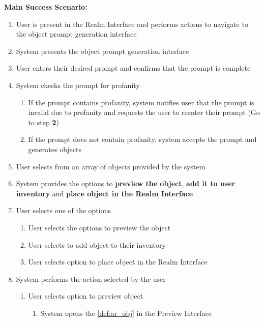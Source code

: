 \documentclass{article}
\begin{document}
\begin{enumerate}[label=\textbf{UC\arabic*}]
          \textbf{Main Success Scenario:}
          \begin{enumerate}[label=\textbf{\arabic*.}]
              \item User is present in the Realm Interface and performs actions to navigate to the object prompt generation interface
              \item System presents the object prompt generation interface
              \item User enters their desired prompt and confirms that the prompt is complete
              \item System checks the prompt for profanity
                    \begin{enumerate}[label=(\alph*)]
                        \item If the prompt contains profanity, system notifies user that the prompt is invalid due to profanity and requests the user to reenter their prompt (Go to step \textbf{2})
                        \item If the prompt does not contain profanity, system accepts the prompt and generates objects
                    \end{enumerate}
              \item User selects from an array of objects provided by the system
              \item System provides the options to \textbf{preview the object}, \textbf{add it to user inventory} and \textbf{place object in the Realm Interface}
              \item User selects one of the options
                    \begin{enumerate}[label=(\alph*)]
                        \item User selects the options to preview the object
                        \item User selects to add object to their inventory
                        \item User selects option to place object in the Realm Interface
                    \end{enumerate}
              \item System performs the action selected by the user
                    \begin{enumerate}[label=(\alph*)]
                        \item User selects option to preview object
                              \begin{enumerate}
                                  \item System opens the \ref{def:ar_obj} in the Preview Interface

\end{enumerate}
\end{enumerate}
\end{enumerate}
\end{enumerate}
\end{document}
